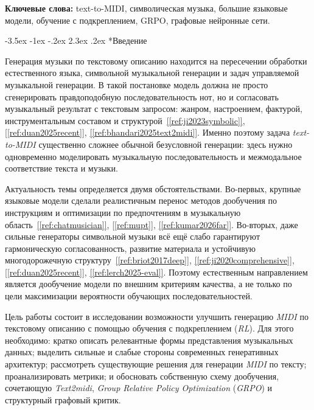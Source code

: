 \documentclass[a4paper,12pt]{extarticle}
\makeatletter
\newcommand{\sourcecite}[1]{\hyperref[#1]{[\ref*{#1}]}}
\renewcommand\section{\@startsection{section}{1}{\z@}%
  {-3.5ex \@plus -1ex \@minus -.2ex}%
  {2.3ex \@plus.2ex}%
  {\normalfont\Large\bfseries\Needspace{8\baselineskip}}}
\makeatother
\begin{document}
\textbf{Ключевые слова:} text-to-MIDI, символическая музыка, большие языковые модели, обучение с подкреплением, GRPO, графовые нейронные сети.

\newpage


\section*{Введение}

Генерация музыки по текстовому описанию находится на пересечении обработки естественного языка, символьной музыкальной генерации и задач управляемой музыкальной генерации. В такой постановке модель должна не просто сгенерировать правдоподобную последовательность нот, но и согласовать музыкальный результат с текстовым запросом: жанром, настроением, фактурой, инструментальным составом и структурой~\sourcecite{ref:ji2023symbolic}, \sourcecite{ref:duan2025recent}, \sourcecite{ref:bhandari2025text2midi}. Именно поэтому задача \textit{text-to-MIDI} существенно сложнее обычной безусловной генерации: здесь нужно одновременно моделировать музыкальную последовательность и межмодальное соответствие текста и музыки.

Актуальность темы определяется двумя обстоятельствами. Во-первых, крупные языковые модели сделали реалистичным перенос методов дообучения по инструкциям и оптимизации по предпочтениям в музыкальную область~\sourcecite{ref:chatmusician}, \sourcecite{ref:mupt}, \sourcecite{ref:kumar2026far}. Во-вторых, даже сильные генераторы символьной музыки всё ещё слабо гарантируют гармоническую согласованность, развитие материала и устойчивую многодорожечную структуру~\sourcecite{ref:briot2017deep}, \sourcecite{ref:ji2020comprehensive}, \sourcecite{ref:duan2025recent}, \sourcecite{ref:lerch2025-eval}. Поэтому естественным направлением является дообучение модели по внешним критериям качества, а не только по цели максимизации вероятности обучающих последовательностей.

Цель работы состоит в исследовании возможности улучшить генерацию \textit{MIDI} по текстовому описанию с помощью обучения с подкреплением (\textit{RL}). Для этого необходимо: кратко описать релевантные формы представления музыкальных данных; выделить сильные и слабые стороны современных генеративных архитектур; рассмотреть существующие решения для генерации \textit{MIDI} по тексту; проанализировать метрики; и обосновать собственную схему дообучения, сочетающую \textit{Text2midi}, \textit{Group Relative Policy Optimization} (\textit
{GRPO}) и структурный графовый критик.
\end{document}
